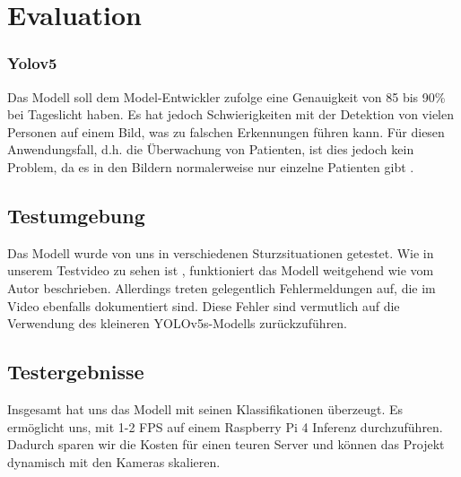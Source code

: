 \section{Evaluation}

\subsubsection{Yolov5}
Das Modell soll dem Model-Entwickler zufolge eine Genauigkeit von 85 bis 90\% bei Tageslicht haben. Es hat jedoch Schwierigkeiten mit der Detektion von vielen Personen auf einem Bild, was zu falschen Erkennungen führen kann. Für diesen Anwendungsfall, d.h. die Überwachung von Patienten, ist dies jedoch kein Problem, da es in den Bildern normalerweise nur einzelne Patienten gibt \cite{kumar_uttej2001image-based-human-fall-detection_2024}. 

\subsection{Testumgebung}
Das Modell wurde von uns in verschiedenen Sturzsituationen getestet. Wie in unserem Testvideo zu sehen ist \cite{yolovideo}, funktioniert das Modell weitgehend wie vom Autor beschrieben. Allerdings treten gelegentlich Fehlermeldungen auf, die im Video ebenfalls dokumentiert sind. Diese Fehler sind vermutlich auf die Verwendung des kleineren YOLOv5s-Modells zurückzuführen.

\subsection{Testergebnisse}

Insgesamt hat uns das Modell mit seinen Klassifikationen überzeugt. Es ermöglicht uns, mit 1-2 FPS auf einem Raspberry Pi 4 Inferenz durchzuführen. Dadurch sparen wir die Kosten für einen teuren Server und können das Projekt dynamisch mit den Kameras skalieren.
